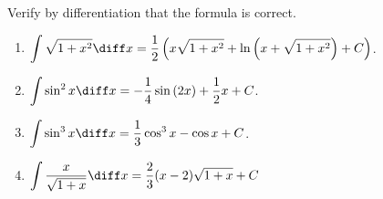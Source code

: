 Verify by differentiation that the formula is correct.
\begin{multicols}{2}
\begin{enumerate}
\item $\displaystyle \int\sqrt{1+x^2}\diff x=  \frac{1}{2}\left( x \sqrt{1+x^2} +\ln \left(x+\sqrt{1+x^2}\right)+C \right) $.
\item $\displaystyle \int \sin^2x \diff x=-\frac{1}{4} \sin{}(2 x)+\frac{1}{2} x+C$.
\item $\displaystyle \int \sin^3 x \diff x =\frac{1}{3} \cos^{3}{}x- \cos{}x+C$.
\item $\displaystyle \int \frac{x}{\sqrt{1+x}}\diff x= \frac{2}{3}(x-2)\sqrt{1+x}+C$
\end{enumerate}
\end{multicols}